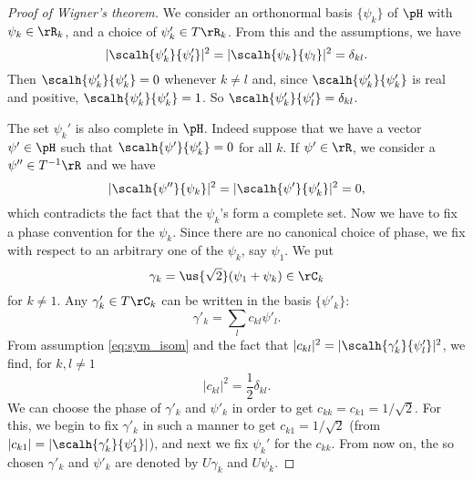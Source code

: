 \begin{proof}[Proof of Wigner's theorem]
We consider an orthonormal basis $\{\psi_k\}$ of $\pH$ with $\psi_k\in\rR_k$, and a choice of $\psi'_k\in T\rR_k$. From this and the assumptions, we have
\[
|\scalh{\psi'_k}{\psi'_l}|^2=|\scalh{\psi_k}{\psi_l}|^2=\delta_{kl}.
\]
Then $\scalh{\psi'_k}{\psi'_k}=0$ whenever $k\neq l$ and, since $\scalh{\psi'_k}{\psi'_k}$ is real and positive, $\scalh{\psi'_k}{\psi'_k}=1$. So $\scalh{\psi'_k}{\psi'_l}=\delta_{kl}$. 

The set $\psi_k'$ is also complete in $\pH$. Indeed suppose that we have a vector $\psi'\in\pH$ such that $\scalh{\psi'}{\psi'_k}=0$ for all $k$. If $\psi'\in\rR$, we consider a $\psi''\in T^{-1}\rR$ and we have
\[
   |\scalh{\psi''}{\psi_k}|^2=|\scalh{\psi'}{\psi'_k}|^2=0,
\]
which contradicts the fact that the $\psi_k$'s form a complete set. Now we have to fix a phase convention for the $\psi_k$. Since there are no canonical choice of phase, we fix with respect to an arbitrary one of the $\psi_k$, say $\psi_1$. We put
\begin{equation}
  \gamma_k=\us{\sqrt{2}}(\psi_1+\psi_k)\in\rC_k
\end{equation}
for $k\neq 1$. Any $\gamma'_k\in T\rC_k$ can be written in the basis $\{\psi'_k\}$:
\begin{equation}\label{eq:gamma_psi_k}
  \gamma'_k=\sum_l c_{kl}\psi'_l.
\end{equation}
From assumption \eqref{eq:sym_isom} and the fact that $|c_{kl}|^2=|\scalh{\gamma'_k}{\psi'_l}|^2$, we find, for $k,l\neq 1$
\[
  |c_{kl}|^2=\frac{1}{2}\delta_{kl}.
\]
We can choose the phase of $\gamma'_k$ and $\psi'_k$ in order to get $c_{kk}=c_{k1}=1/\sqrt{2}$. For this, we begin to fix $\gamma'_k$ in such a manner to get $c_{k1}=1/\sqrt{2}$ (from $|c_{k1}|=|\scalh{\gamma'_k}{\psi'_1}|$), and next we fix $\psi_k'$ for the $c_{kk}$. From now on, the so chosen $\gamma'_k$ and $\psi'_k$ are denoted by $U\gamma_k$ and $U\psi_k$. 


\end{proof}
